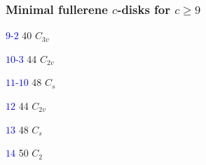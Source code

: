 \documentclass{beamer}
\begin{document}
\begin{frame}\frametitle{Minimal fullerene $c$-disks for
$c\ge 9$} 
\vspace{-4mm}
\begin{center}
\begin{minipage}[b]{17mm}\centering
{}\par
\textcolor{blue}{$9$-$2$} 40 $C_{3v}$
\end{minipage}
\begin{minipage}[b]{17mm}
\centering
{}\par
\textcolor{blue}{$10$-$3$} 44 $C_{2v}$
\end{minipage}
\begin{minipage}[b]{17mm}
\centering
{}\par
\textcolor{blue}{$11$-$10$} 48 $C_{s}$
\end{minipage}
\begin{minipage}[b]{27mm}
\centering
{}\par
\textcolor{blue}{$12$} 44 $C_{2v}$
\end{minipage}
\end{center}
\vspace{-3mm}
\begin{center} 
\begin{minipage}[b]{26mm}
\centering
{}\par
\textcolor{blue}{$13$} 48 $C_{s}$
\end{minipage}
\begin{minipage}[b]{26mm}
\centering
{}\par
\textcolor{blue}{$14$} 50 $C_{2}$
\end{minipage}
\begin{minipage}[b]{26mm}

\end{minipage}
\end{center}
\end{frame}
\end{document}
